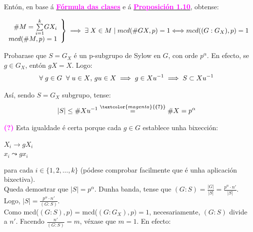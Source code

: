\documentclass[twoside]{report}
\newcommand{\magbf}[1]{\textcolor{magenta}{\textbf{#1}}} %
\theoremstyle{mystyle}
\begin{document}
\noindent Entón, en base á \hyperref[prop1.11]{\magbf{Fórmula das clases}} e á \hyperref[prop1.10]{\magbf{Proposición 1.10}}, obtense:

    \[ 
    \left. \begin{array}{r} 
    \#M = \underset{i = 1}{\overset{k}{\sum}} GX_{i} \\[1ex]
    mcd(\#M, p) = 1
    \end{array} \right\} 
    \implies \exists \hspace{1mm} X \in M \hspace{1mm} | \hspace{1mm} mcd(\#GX, p) = 1 \Longleftrightarrow mcd((G : G_{X}), p) = 1\\
    \]
    
\vspace{2mm}
    
\noindent Probarase que $S = G_{X}$ é un p-subgrupo de Sylow en $G$, con orde $p^{\alpha}$. En efecto, se $g \in G_{X}$, entón $gX = X$. Logo:
$$\forall \hspace{1mm} g \in G \hspace{2mm} \forall \hspace{1mm} u \in X \text{, } gu \in X \implies g \in Xu^{-1} \implies S \subset Xu^{-1}$$

\noindent Así, sendo $S = G_{X}$ subgrupo, tense:
$$|S| \leq \#Xu^{-1} \overset{\magbf{(?)}}{=} \#X = p^{\alpha}$$

\noindent \magbf{(?)} Esta igualdade é certa porque cada $g \in G$ establece unha bixección:

    \begin{center}
    $X_{i} \longrightarrow gX_{i}$ \\
    \vspace{2mm}
    \hspace{1mm} $x_{i} \leadsto gx_{i}$
    \end{center} 
    
\noindent para cada $i \in \{1, 2, \dots, k\}$ (pódese comprobar facilmente que é unha aplicación bixectiva).\\

\noindent Queda demostrar que $|S| = p^{\alpha}$. Dunha banda, tense que $(G:S) = \displaystyle \frac{|G|}{|S|} = \displaystyle \frac{p^{\alpha} \cdot n'}{|S|}$. Logo, $|S| = \displaystyle \frac{p^{\alpha} \cdot n'}{(G:S)}$.\\

\noindent Como mcd($(G:S),p$) = mcd($(G:G_{X}), p) = 1$, necesariamente, $(G:S)$ divide a $n'$. Facendo $\displaystyle \frac{n'}{(G:S)} = m$, véxase que $m = 1$. En efecto:
\end{document}
